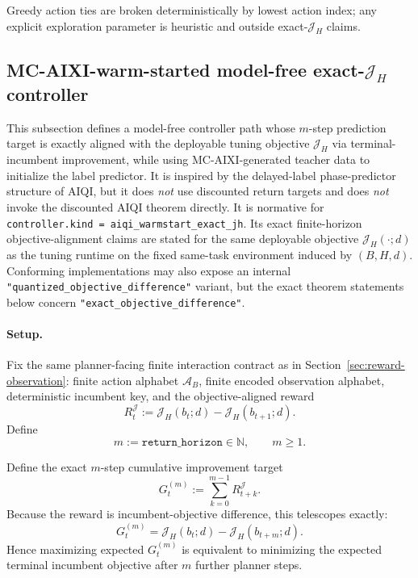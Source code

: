 \documentclass[11pt]{article}
\begin{document}
Greedy action ties are broken deterministically by lowest action index; any
explicit exploration parameter is heuristic and outside exact-$\mathcal{J}_H$
claims.

\subsection{MC-AIXI-warm-started model-free exact-\texorpdfstring{$\mathcal{J}_H$}{J\_H} controller}
\label{sec:aiqi-warmstart-exact-jh}

This subsection defines a model-free controller path whose $m$-step prediction
target is exactly aligned with the deployable tuning objective $\mathcal{J}_H$
via terminal-incumbent improvement, while using MC-AIXI-generated teacher data
to initialize the label predictor. It is inspired by the delayed-label
phase-predictor structure of AIQI, but it does \emph{not} use discounted return
targets and does \emph{not} invoke the discounted AIQI theorem directly.
It is normative for
\texttt{controller.kind = aiqi\_warmstart\_exact\allowbreak\_jh}.
Its exact finite-horizon objective-alignment claims are stated for the same
deployable objective $\mathcal{J}_H(\cdot;d)$ as the tuning runtime on the
fixed same-task environment induced by $(B,H,d)$.
Conforming implementations may also expose
an internal \texttt{"quantized\_objective\_difference"} variant, but
the exact theorem statements below concern
\texttt{"exact\_objective\_difference"}.

\paragraph{Setup.}
Fix the same planner-facing finite interaction contract as in
Section~\ref{sec:reward-observation}: finite action alphabet
$\mathcal{A}_B$, finite encoded observation alphabet, deterministic incumbent
key, and the objective-aligned reward
\[
R_t^{\mathcal{J}}:=\mathcal{J}_H(b_t;d)-\mathcal{J}_H(b_{t+1};d).
\]
Define
\[
m:=\texttt{return\_horizon}\in\mathbb{N},\qquad m\ge 1.
\]

Define the exact $m$-step cumulative improvement target
\[
G_t^{(m)}
:=
\sum_{k=0}^{m-1} R_{t+k}^{\mathcal{J}}.
\]
Because the reward is incumbent-objective difference, this telescopes exactly:
\[
G_t^{(m)}
=
\mathcal{J}_H(b_t;d)-\mathcal{J}_H(b_{t+m};d).
\]
Hence maximizing expected $G_t^{(m)}$ is equivalent to minimizing the expected
terminal incumbent objective after $m$ further planner steps.
\end{document}
